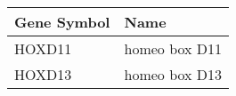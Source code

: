 \begin{tabular}{ll}
\toprule
Gene Symbol &          Name \\
\midrule
     HOXD11 & homeo box D11 \\
     HOXD13 & homeo box D13 \\
\bottomrule
\end{tabular}
